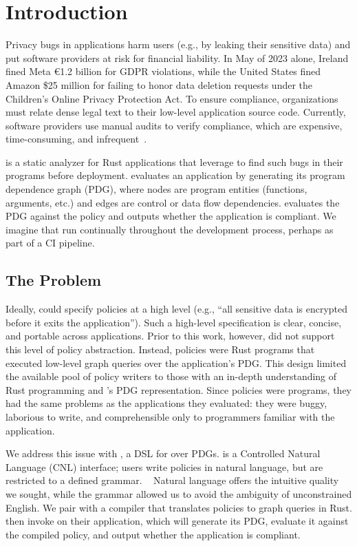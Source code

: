 \chapter{Introduction}
\label{sec:intro}

Privacy bugs in applications harm users (e.g., by leaking their sensitive data) and put software providers 
at risk for financial liability.
%
In May of 2023 alone, Ireland fined Meta €1.2 billion for GDPR violations, 
while the United States fined Amazon \$25 million for failing to honor data deletion requests 
under the Children’s Online Privacy Protection Act\cite{meta-fine,amazon-fine}.
%
To ensure compliance, organizations must relate dense legal text to their low-level application source code.
%
Currently, software providers use manual audits to verify compliance, which are expensive, time-consuming,
and infrequent~\cite{CostContinuousCompliance2020,smithGDPRRacketWho}.

\sys{} is a static analyzer for Rust applications that \devs{} leverage to find such bugs in their programs before deployment.
%
\sys{} evaluates an application by generating its program dependence graph (PDG), 
where nodes are program entities (functions, arguments, etc.) and edges are control or data flow dependencies.
%
\sys{} evaluates the PDG against the policy and outputs whether the application is compliant.
%
We imagine that \devs{} run \sys{} continually throughout the development process, perhaps as part of a CI pipeline.

\section{The Problem}
Ideally, \writers{} could specify policies at a high level (e.g., ``all sensitive data is encrypted before it exits the application'').
%
Such a high-level specification is clear, concise, and portable across applications.
%
Prior to this work, however, \sys{} did not support this level of policy abstraction.
%
Instead, policies were Rust programs that executed low-level graph queries over the application's PDG.
%
This design limited the available pool of policy writers to those with an in-depth understanding of Rust programming and \sys{}'s PDG representation.
%
Since policies were programs, they had the same problems as the applications they evaluated: 
they were buggy, laborious to write, and comprehensible only to programmers familiar with the application.
%

We address this issue with \syslang{}, a DSL for \policies{} over PDGs.
%
\syslang{} is a Controlled Natural Language (CNL) interface; users write policies in natural language, but are restricted to a defined grammar. ~\cite{cnl-def}
%
Natural language offers the intuitive quality we sought, while the grammar allowed us to avoid the ambiguity of unconstrained English.
%
We pair \syslang{} with a compiler that translates policies to \sys{} graph queries in Rust.
%
\Devs{} then invoke \sys{} on their application,
which will generate its PDG, evaluate it against the compiled \syslang{} policy,
and output whether the application is compliant.
%

